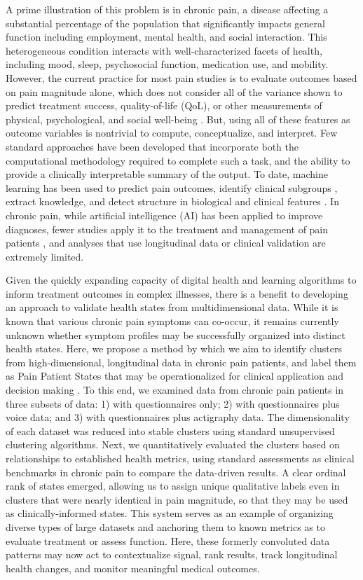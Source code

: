 \documentclass[conference]{IEEEtran}
\begin{document}
A prime illustration of this problem is in chronic pain, a disease affecting a substantial percentage of the population \cite{Zelaya2019} that significantly impacts general function including employment, mental health, and social interaction. This heterogeneous condition interacts with well-characterized facets of health, including mood, sleep, psychosocial function, medication use, and mobility. However, the current practice for most pain studies is to evaluate outcomes based on pain magnitude alone, which does not consider all of the variance shown to predict treatment success, quality-of-life (QoL), or other measurements of physical, psychological, and social well-being \cite{Gatchel2007}. But, using all of these features as outcome variables is nontrivial to compute, conceptualize, and interpret. Few standard approaches have been developed that incorporate both the computational methodology required to complete such a task, and the ability to provide a clinically interpretable summary of the output. To date, machine learning has been used to predict pain outcomes, identify clinical subgroups \cite{Mullin2021}, extract knowledge, and detect structure in biological and clinical features \cite{Lotsch2018}. In chronic pain, while artificial intelligence (AI) has been applied to improve diagnoses, fewer studies apply it to the treatment and management of pain patients \cite{Jenssen2021}, and analyses that use longitudinal data or clinical validation are extremely limited. 

Given the quickly expanding capacity of digital health and learning algorithms to inform treatment outcomes in complex illnesses, there is a benefit to developing an approach to validate health states from multidimensional data. While it is known that various chronic pain symptoms can co-occur, it remains currently unknown whether symptom profiles may be successfully organized into distinct health states. Here, we propose a method by which we aim to identify clusters from high-dimensional, longitudinal data in chronic pain patients, and label them as Pain Patient States that may be operationalized for clinical application and decision making \cite{Reinen2020}\cite{Anitescu2022}. To this end, we examined data from chronic pain patients in three subsets of data: 1) with questionnaires only; 2) with questionnaires plus voice data; and 3) with questionnaires plus actigraphy data. The dimensionality of each dataset was reduced into stable clusters using standard unsupervised clustering algorithms. Next, we quantitatively evaluated the clusters based on relationships to established health metrics, using standard assessments as clinical benchmarks in chronic pain to compare the data-driven results. A clear ordinal rank of states emerged, allowing us to assign unique qualitative labels even in clusters that were nearly identical in pain magnitude, so that they may be used as clinically-informed states. This system serves as an example of organizing diverse types of large datasets and anchoring them to known metrics as to evaluate treatment or assess function. Here, these formerly convoluted data patterns may now act to contextualize signal, rank results, track longitudinal health changes, and monitor meaningful medical outcomes.
\end{document}

